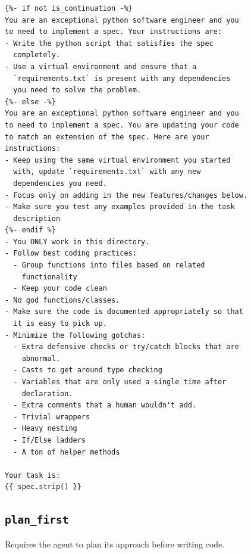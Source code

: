 \begin{lstlisting}[style=specblock, caption={\texttt{anti\_slop} prompt template}, label={lst:anti-slop-prompt}]
{%- if not is_continuation -%}
You are an exceptional python software engineer and you
to need to implement a spec. Your instructions are:
- Write the python script that satisfies the spec
  completely.
- Use a virtual environment and ensure that a
  `requirements.txt` is present with any dependencies
  you need to solve the problem.
{%- else -%}
You are an exceptional python software engineer and you
to need to implement a spec. You are updating your code
to match an extension of the spec. Here are your
instructions:
- Keep using the same virtual environment you started
  with, update `requirements.txt` with any new
  dependencies you need.
- Focus only on adding in the new features/changes below.
- Make sure you test any examples provided in the task
  description
{%- endif %}
- You ONLY work in this directory.
- Follow best coding practices:
  - Group functions into files based on related
    functionality
  - Keep your code clean
- No god functions/classes.
- Make sure the code is documented appropriately so that
  it is easy to pick up.
- Minimize the following gotchas:
  - Extra defensive checks or try/catch blocks that are
    abnormal.
  - Casts to get around type checking
  - Variables that are only used a single time after
    declaration.
  - Extra comments that a human wouldn't add.
  - Trivial wrappers
  - Heavy nesting
  - If/Else ladders
  - A ton of helper methods

Your task is:
{{ spec.strip() }}
\end{lstlisting}

\subsection{\texttt{plan\_first}}

Requires the agent to plan its approach before writing code.

